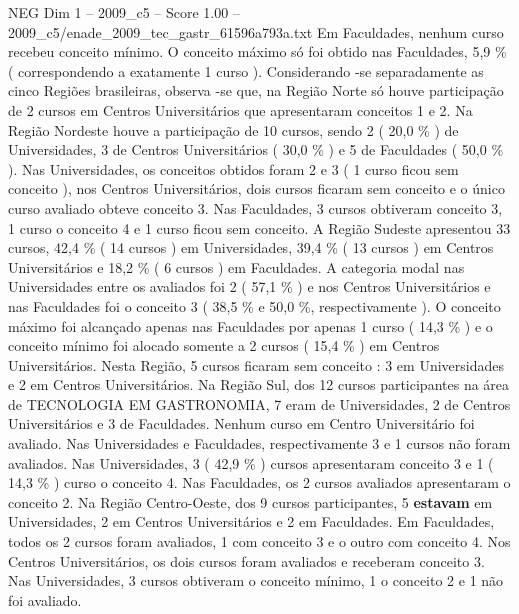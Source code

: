 \begin{textsample}{NEG Dim 1 – 2009\_c5 – Score 1.00 – 2009\_c5/enade\_2009\_tec\_gastr\_61596a793a.txt}
Em Faculdades, nenhum curso recebeu conceito mínimo.
O conceito máximo só foi obtido nas Faculdades, 5,9 \% ( correspondendo a exatamente 1 curso ).
Considerando -se separadamente as cinco Regiões brasileiras, observa -se que, na Região Norte só houve participação de 2 cursos em Centros Universitários que apresentaram conceitos 1 e 2.
Na Região Nordeste houve a participação de 10 cursos, sendo 2 ( 20,0 \% ) de Universidades, 3 de Centros Universitários ( 30,0 \% ) e 5 de Faculdades ( 50,0 \% ).
Nas Universidades, os conceitos obtidos foram 2 e 3 ( 1 curso ficou sem conceito ), nos Centros Universitários, dois cursos ficaram sem conceito e o único curso avaliado obteve conceito 3.
Nas Faculdades, 3 cursos obtiveram conceito 3, 1 curso o conceito 4 e 1 curso ficou sem conceito.
A Região Sudeste apresentou 33 cursos, 42,4 \% ( 14 cursos ) em Universidades, 39,4 \% ( 13 cursos ) em Centros Universitários e 18,2 \% ( 6 cursos ) em Faculdades.
A categoria modal nas Universidades entre os avaliados foi 2 ( 57,1 \% ) e nos Centros Universitários e nas Faculdades foi o conceito 3 ( 38,5 \% e 50,0 \%, respectivamente ).
O conceito máximo foi alcançado apenas nas Faculdades por apenas 1 curso ( 14,3 \% ) e o conceito mínimo foi alocado somente a 2 cursos ( 15,4 \% ) em Centros Universitários.
Nesta Região, 5 cursos ficaram sem conceito : 3 em Universidades e 2 em Centros Universitários.
Na Região Sul, dos 12 cursos participantes na área de TECNOLOGIA EM GASTRONOMIA, 7 eram de Universidades, 2 de Centros Universitários e 3 de Faculdades.
Nenhum curso em Centro Universitário foi avaliado.
Nas Universidades e Faculdades, respectivamente 3 e 1 cursos não foram avaliados.
Nas Universidades, 3 ( 42,9 \% ) cursos apresentaram conceito 3 e 1 ( 14,3 \% ) curso o conceito 4.
Nas Faculdades, os 2 cursos avaliados apresentaram o conceito 2.
Na Região Centro-Oeste, dos 9 cursos participantes, 5 \textbf{estavam} em Universidades, 2 em Centros Universitários e 2 em Faculdades.
Em Faculdades, todos os 2 cursos foram avaliados, 1 com conceito 3 e o outro com conceito 4.
Nos Centros Universitários, os dois cursos foram avaliados e receberam conceito 3.
Nas Universidades, 3 cursos obtiveram o conceito mínimo, 1 o conceito 2 e 1 não foi avaliado.

\end{textsample}
